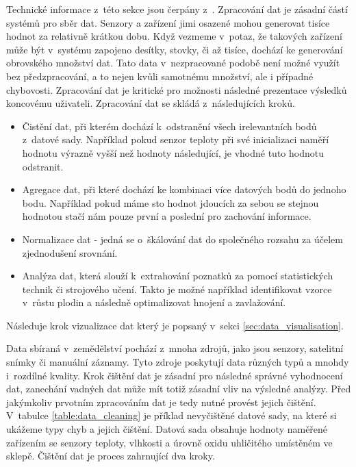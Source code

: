  \label{sec:data_processing}
Technické informace z~této sekce jsou čerpány z~\cite{buyya2016big_POV5}. Zpracování dat je zásadní částí systémů pro sběr dat. Senzory a zařízení jimi osazené mohou generovat tisíce hodnot za relativně krátkou dobu. Když vezmeme v~potaz, že takových zařízení může být v~systému zapojeno desítky, stovky, či až tisíce, dochází ke generování obrovského množství dat. Tato data v~nezpracované podobě není možné využít bez předzpracování, a to nejen kvůli samotnému množství, ale i případné chybovosti. Zpracování dat je kritické pro možnosti následné prezentace výsledků koncovému uživateli. Zpracování dat se skládá z~následujících kroků.
\begin{itemize}
    \item Čistění dat, při kterém dochází k~odstranění všech irelevantních bodů z~datové sady. Například pokud senzor teploty při své inicializaci naměří hodnotu výrazně vyšší než hodnoty následující, je vhodné tuto hodnotu odstranit. 
    \item Agregace dat, při které dochází ke kombinaci více datových bodů do jednoho bodu. Například pokud máme sto hodnot jdoucích za sebou se stejnou hodnotou stačí nám pouze první a poslední pro zachování informace.
    \item Normalizace dat - jedná se o~škálování dat do společného rozsahu za účelem zjednodušení srovnání.
    \item Analýza dat, která slouží k~extrahování poznatků za pomocí statistických technik či strojového učení. Takto je možné například identifikovat vzorce v~růstu plodin a následně optimalizovat hnojení a zavlažování.
\end{itemize}
Následuje krok vizualizace dat který je popsaný v~sekci \ref{sec:data_visualisation}. 

Data sbíraná v~zemědělství pochází z~mnoha zdrojů, jako jsou senzory, satelitní snímky či manuální záznamy. Tyto zdroje poskytují data různých typů a mnohdy i~rozdílné kvality. Krok čištění dat je zásadní pro následné správné vyhodnocení dat, zanechání vadných dat může mít totiž zásadní vliv na výsledné analýzy. Před jakýmkoliv prvotním zpracováním dat je tedy nutné provést jejich čištění. V~tabulce \ref{table:data_cleaning} je příklad nevyčištěné datové sady, na které si ukážeme typy chyb a jejich čištění. Datová sada obsahuje hodnoty naměřené zařízením se senzory teploty, vlhkosti a úrovně oxidu uhličitého umístěném ve sklepě. Čištění dat je proces zahrnující dva kroky. \cite{rahm2000data}

